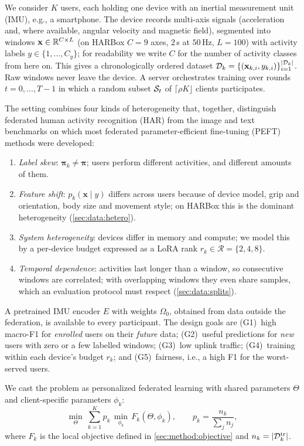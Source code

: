 We consider $K$ users, each holding one device with an inertial measurement unit (IMU), e.g., a
smartphone. The device records multi-axis signals (acceleration and, where available, angular
velocity and magnetic field), segmented into windows $\mathbf{x}\in\mathbb{R}^{C\times L}$ (on HARBox $C=9$
axes, $2$\,s at $50$\,Hz, $L=100$) with activity labels $y\in\{1,\dots,C_y\}$; for readability we
write $C$ for the number of activity classes from here on. This gives a chronologically ordered dataset
$\mathcal{D}_k=\{(\mathbf{x}_{k,i},y_{k,i})\}_{i=1}^{|\mathcal{D}_k|}$. Raw windows never leave the device. A
server orchestrates training over rounds $t=0,\dots,T-1$ in which a random subset
$\mathcal{S}_t$ of $\lceil\rho K\rfloor$ clients participates.

The setting combines four kinds of heterogeneity that, together, distinguish federated human
activity recognition (HAR) from the image and text benchmarks on which most federated
parameter-efficient fine-tuning (PEFT) methods were developed:
\begin{enumerate}[label=(H\arabic*)]
  \item \emph{Label skew}: $\boldsymbol{\pi}_k\neq\boldsymbol{\pi}$; users perform different
        activities, and different amounts of them.
  \item \emph{Feature shift}: $p_k(\mathbf{x}\mid y)$ differs across users because of device
        model, grip and orientation, body size and movement style; on HARBox this is the
        dominant heterogeneity (\cref{sec:data:hetero}).
  \item \emph{System heterogeneity}: devices differ in memory and compute; we model this by a
        per-device budget expressed as a LoRA rank $r_k\in\mathcal{R}=\{2,4,8\}$.
  \item \emph{Temporal dependence}: activities last longer than a window, so consecutive
        windows are correlated; with overlapping windows they even share samples, which an
        evaluation protocol must respect (\cref{sec:data:splits}).
\end{enumerate}
A pretrained IMU encoder $E$ with weights $\Omega_0$, obtained from data outside the
federation, is available to every participant. The design goals are
(G1)~high macro-F1 for \emph{enrolled} users on their \emph{future} data;
(G2)~useful predictions for \emph{new} users with zero or a few labelled windows;
(G3)~low uplink traffic;
(G4)~training within each device's budget $r_k$; and
(G5)~fairness, i.e., a high F1 for the worst-served users.

We cast the problem as personalized federated learning with shared parameters $\Theta$ and
client-specific parameters $\phi_k$:
\begin{equation}\label{eq:global}
  \min_{\Theta}\ \sum_{k=1}^{K} p_k\,\min_{\phi_k}\,F_k(\Theta,\phi_k),\qquad
  p_k=\frac{n_k}{\sum_{j}n_j},
\end{equation}
where $F_k$ is the local objective defined in \cref{sec:method:objective} and $n_k=|\mathcal{D}_k^{\mathrm{tr}}|$.

